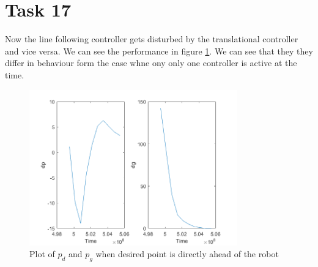 \documentclass[a4paper,12pt,oneside,onecolumn]{article} %
\begin{document}
\section*{Task 17}
Now the line following controller gets disturbed by the translational controller and vice versa. We can see the performance in figure \ref{17}.  We can see that they they differ in behaviour form the case whne ony only one controller is active at the time.
\begin{figure}[H]
\begin{center}	
  \includegraphics[width = 0.8\textwidth]{task17.png}
  \caption{Plot of  $p_d$ and $p_g$ when desired point is directly ahead of the robot}\label{17}
 \end{center}
\end{figure}
\end{document}

